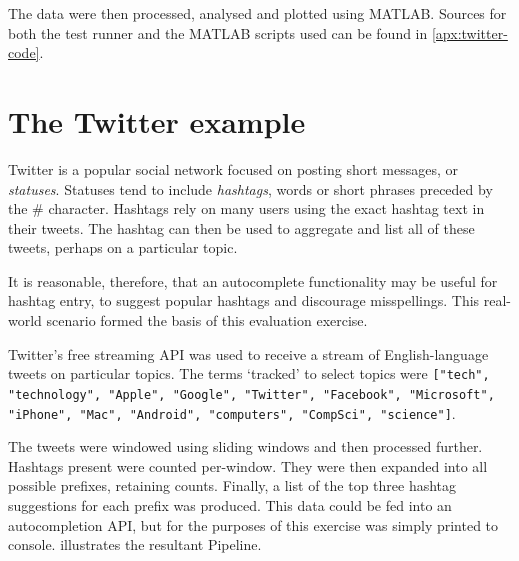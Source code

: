The data were then processed, analysed and plotted using MATLAB.
Sources for both the test runner and the MATLAB scripts used can be found in \cref{apx:twitter-code}.

\section{The Twitter example}\label{sec:eval:approach:twitter}

Twitter is a popular social network focused on posting short messages, or \emph{statuses}.
Statuses tend to include \emph{hashtags}, words or short phrases preceded by the \# character.
Hashtags rely on many users using the exact hashtag text in their tweets.
The hashtag can then be used to aggregate and list all of these tweets, perhaps on a particular topic.

It is reasonable, therefore, that an autocomplete functionality may be useful for hashtag entry, to suggest popular hashtags and discourage misspellings.
This real-world scenario formed the basis of this evaluation exercise.

Twitter's free streaming API \cite{TwitterStreamingAPI} was used to receive a stream of English-language tweets on particular topics.
The terms `tracked' to select topics were \texttt{["tech", "technology", "Apple", "Google", "Twitter", "Facebook", "Microsoft", "iPhone", "Mac", "Android", "computers", "CompSci", "science"]}.

The tweets were windowed using sliding windows and then processed further.
Hashtags present were counted per-window.
They were then expanded into all possible prefixes, retaining counts.
Finally, a list of the top three hashtag suggestions for each prefix was produced.
This data could be fed into an autocompletion API, but for the purposes of this exercise was simply printed to console.
 illustrates the resultant Pipeline.

